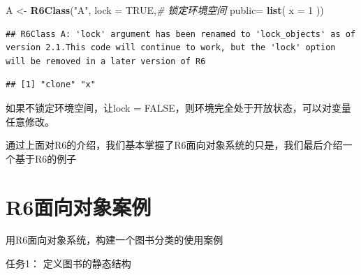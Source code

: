 \documentclass[]{book}
\newenvironment{Shaded}{\begin{snugshade}}{\end{snugshade}}
\newcommand{\KeywordTok}[1]{\textcolor[rgb]{0.13,0.29,0.53}{\textbf{#1}}}
\newcommand{\DataTypeTok}[1]{\textcolor[rgb]{0.13,0.29,0.53}{#1}}
\newcommand{\DecValTok}[1]{\textcolor[rgb]{0.00,0.00,0.81}{#1}}
\newcommand{\StringTok}[1]{\textcolor[rgb]{0.31,0.60,0.02}{#1}}
\newcommand{\CommentTok}[1]{\textcolor[rgb]{0.56,0.35,0.01}{\textit{#1}}}
\newcommand{\OtherTok}[1]{\textcolor[rgb]{0.56,0.35,0.01}{#1}}
\newcommand{\OperatorTok}[1]{\textcolor[rgb]{0.81,0.36,0.00}{\textbf{#1}}}
\newcommand{\NormalTok}[1]{#1}
\begin{document}
\begin{Shaded}
\begin{Highlighting}[]
\NormalTok{A <-}\StringTok{ }\KeywordTok{R6Class}\NormalTok{(}\StringTok{"A"}\NormalTok{,}
             \DataTypeTok{lock =} \OtherTok{TRUE}\NormalTok{,}\CommentTok{# 锁定环境空间}
             \DataTypeTok{public=} \KeywordTok{list}\NormalTok{(}
             \DataTypeTok{x =} \DecValTok{1}
\NormalTok{             ))}
\end{Highlighting}
\end{Shaded}

\begin{verbatim}
## R6Class A: 'lock' argument has been renamed to 'lock_objects' as of version 2.1.This code will continue to work, but the 'lock' option will be removed in a later version of R6
\end{verbatim}

\begin{Shaded}
\end{Shaded}

\begin{verbatim}
## [1] "clone" "x"
\end{verbatim}

\begin{Shaded}
\end{Shaded}

如果不锁定环境空间，让lock =
FALSE，则环境完全处于开放状态，可以对变量任意修改。

通过上面对R6的介绍，我们基本掌握了R6面向对象系统的只是，我们最后介绍一个基于R6的例子

\section{R6面向对象案例}\label{r6}

用R6面向对象系统，构建一个图书分类的使用案例

任务1： 定义图书的静态结构
\end{document}
